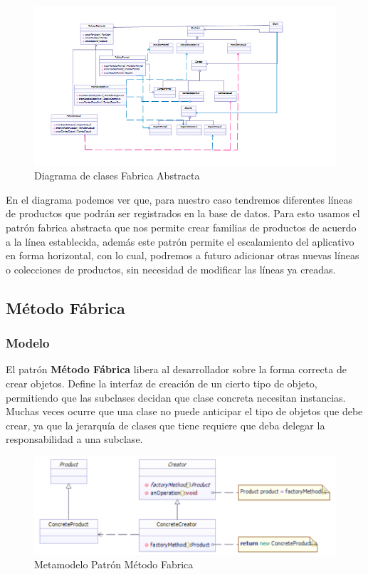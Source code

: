 	\begin{figure}[th!]
		\centering
		\includegraphics[width=1\linewidth]{arquitectura/imagenes/DiagramaFabricaAbstracta}
		\caption{Diagrama de clases Fabrica Abstracta}
	\end{figure}
	
	
	
	En el diagrama podemos ver que, para nuestro caso tendremos diferentes líneas de productos que podrán ser registrados en la base de datos. Para esto usamos el patrón fabrica abstracta que nos permite crear familias de productos de acuerdo a la línea establecida, además este patrón permite el escalamiento del aplicativo en forma horizontal, con lo cual, podremos a futuro adicionar otras nuevas líneas o colecciones de productos, sin necesidad de modificar las líneas ya creadas.
	
	


\subsection{Método Fábrica}
\subsubsection{Modelo}
El patrón \textbf{Método Fábrica} libera al desarrollador sobre la forma correcta de crear objetos. Define la interfaz de creación de un cierto tipo de objeto, permitiendo que las subclases decidan que clase concreta necesitan instancias. Muchas veces ocurre que una clase no puede anticipar el tipo de objetos que debe crear, ya que la jerarquía de clases que tiene requiere que deba delegar la responsabilidad a una subclase. 

\begin{figure}[th!]
	\centering
	\includegraphics[width=1.0\linewidth]{arquitectura/imagenes/modeloMetFab}
	\caption{Metamodelo Patrón Método Fabrica}
	\label{fig:metamodelo metodo fabrica}
\end{figure}


